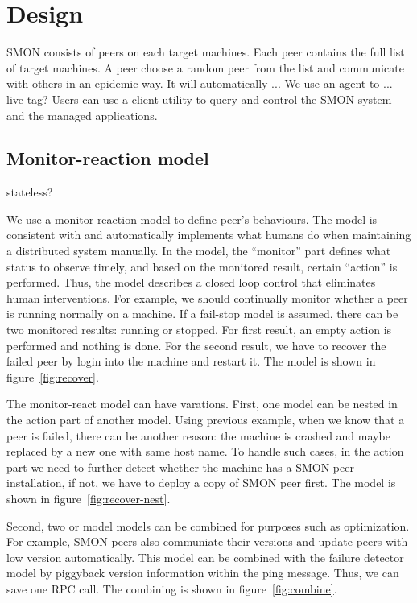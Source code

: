 \section{Design}
\label{sec:design}

SMON consists of peers on each target machines. Each peer
contains the full list of target machines. A peer choose a
random peer from the list and communicate with others in an
epidemic way. It will automatically ... We use an agent to
... live tag? Users can use a client utility to query and
control the SMON system and the managed applications.


\subsection{Monitor-reaction model}

stateless?

We use a monitor-reaction model to define peer's behaviours.
The model is consistent with and automatically implements
what humans do when maintaining a distributed system
manually. In the model, the ``monitor'' part defines what
status to observe timely, and based on the monitored result,
certain ``action'' is performed. Thus, the model describes a
closed loop control that eliminates human interventions.
For example, we should continually monitor whether a peer is
running normally on a machine. If a fail-stop model is
assumed, there can be two monitored results: running or
stopped. For first result, an empty action is performed and
nothing is done. For the second result, we have to recover
the failed peer by login into the machine and restart it.
The model is shown in figure~\ref{fig:recover}.

The monitor-react model can have varations. First, one model
can be nested in the action part of another model. Using
previous example, when we know that a peer is failed, there
can be another reason: the machine is crashed and maybe
replaced by a new one with same host name. To handle such
cases, in the action part we need to further detect whether
the machine has a SMON peer installation, if not, we have to
deploy a copy of SMON peer first. The model is shown in
figure~\ref{fig:recover-nest}.

Second, two or model models can be combined for purposes
such as optimization. For example, SMON peers also
communiate their versions and update peers with low version
automatically. This model can be combined with the failure
detector model by piggyback version information within the
ping message. Thus, we can save one RPC call.
The combining is shown in figure~\ref{fig:combine}.

